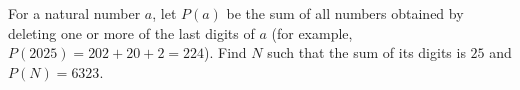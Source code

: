 For a natural number $a$, let $P(a)$ be the sum of all numbers obtained by deleting one or more of the last digits of $a$ (for example, $P(2025)=202+20+2=224$). Find $N$ such that the sum of its digits is $25$ and $P(N)=6323$.
